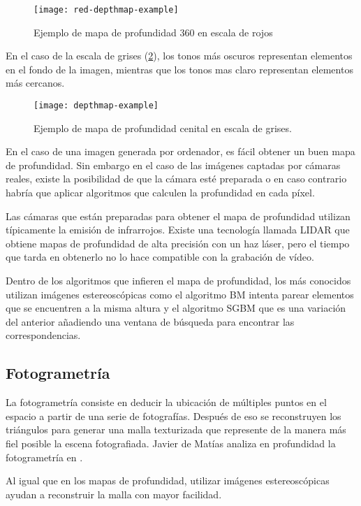 \begin{figure}[h]
  \centering
  \texttt{[image: red-depthmap-example]}
  \caption{Ejemplo de mapa de profundidad 360 en escala de rojos}
  \label{fig:red-depthmap-example}
\end{figure}

En el caso de la escala de grises (\ref{fig:depthmap-example}), los tonos más oscuros representan elementos en el fondo de la imagen, mientras que los tonos mas claro representan elementos más cercanos.

\begin{figure}[h]
  \centering
  \texttt{[image: depthmap-example]}
  \caption{Ejemplo de mapa de profundidad cenital en escala de grises.}
  \label{fig:depthmap-example}
\end{figure}

En el caso de una imagen generada por ordenador, es fácil obtener un buen mapa de profundidad. Sin embargo en el caso de las imágenes captadas por cámaras reales, existe la posibilidad de que la cámara esté preparada o en caso contrario habría que aplicar algoritmos que calculen la profundidad en cada píxel. 

Las cámaras que están preparadas para obtener el mapa de profundidad utilizan típicamente la emisión de infrarrojos. Existe una tecnología llamada LIDAR que obtiene mapas de profundidad de alta precisión con un haz láser, pero el tiempo que tarda en obtenerlo no lo hace compatible con la grabación de vídeo.

Dentro de los algoritmos que infieren el mapa de profundidad, los más conocidos utilizan imágenes estereoscópicas como el algoritmo BM  intenta parear elementos que se encuentren a la misma altura y el algoritmo SGBM que es una variación del anterior añadiendo una ventana de búsqueda para encontrar las correspondencias.

\subsection{Fotogrametría}
La fotogrametría consiste en deducir la ubicación de múltiples puntos en el espacio a partir de una serie de fotografías. Después de eso se reconstruyen los triángulos para generar una malla texturizada que represente de la manera más fiel posible la escena fotografiada. Javier de Matías analiza en profundidad la fotogrametría en \cite{PhotogrametryThesis}.

Al igual que en los mapas de profundidad, utilizar imágenes estereoscópicas ayudan a reconstruir la malla con mayor facilidad.

